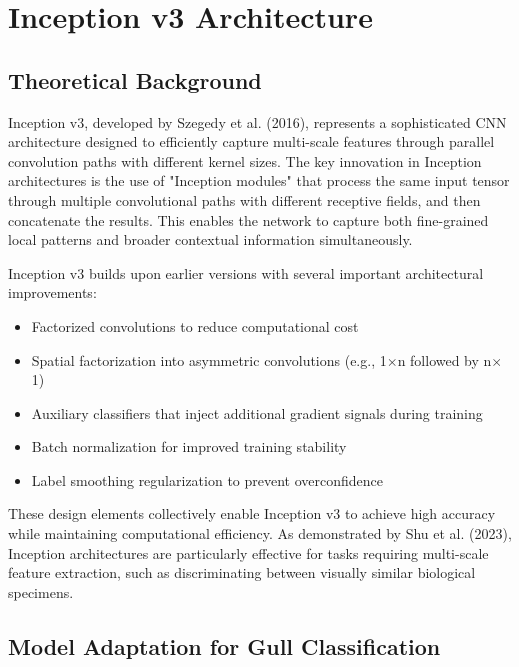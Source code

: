 



\section{Inception v3 Architecture}

\subsection{Theoretical Background}

Inception v3, developed by Szegedy et al. (2016), represents a sophisticated CNN architecture designed to efficiently capture multi-scale features through parallel convolution paths with different kernel sizes. The key innovation in Inception architectures is the use of "Inception modules" that process the same input tensor through multiple convolutional paths with different receptive fields, and then concatenate the results. This enables the network to capture both fine-grained local patterns and broader contextual information simultaneously.

Inception v3 builds upon earlier versions with several important architectural improvements:

\begin{itemize}
    \item Factorized convolutions to reduce computational cost
    \item Spatial factorization into asymmetric convolutions (e.g., 1$\times$n followed by n$\times$1)
    \item Auxiliary classifiers that inject additional gradient signals during training
    \item Batch normalization for improved training stability
    \item Label smoothing regularization to prevent overconfidence
\end{itemize}

These design elements collectively enable Inception v3 to achieve high accuracy while maintaining computational efficiency. As demonstrated by Shu et al. (2023), Inception architectures are particularly effective for tasks requiring multi-scale feature extraction, such as discriminating between visually similar biological specimens.

\subsection{Model Adaptation for Gull Classification}

